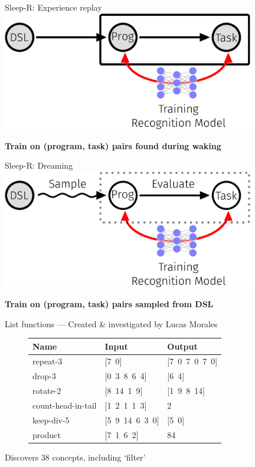 \documentclass{beamer}
\begin{document}
\begin{frame}[t]{Sleep-R: Experience replay}
  \includegraphics[width = 11cm]{figures/animation/Sleep-R-1.eps}

    \textbf{Train on (program, task) pairs found during waking}
\end{frame}
\begin{frame}[t]{Sleep-R: Dreaming}
  \includegraphics[width = 11cm]{figures/animation/Sleep-R-2.eps}

    \textbf{Train on (program, task) pairs sampled from DSL}

\end{frame}




\begin{frame}{List functions --- \small{Created \& investigated by Lucas
  Morales}}


  \vspace{1cm}
  
  \begin{figure}[b]\centering
\vspace{-0.5cm}  \begin{tabular}{lll}
    \toprule
    Name & Input & Output \\\midrule
    repeat-3 & [7\, 0] & [7\, 0\, 7\, 0\, 7\, 0] \\
    drop-3 & [0\, 3\, 8\, 6\, 4] & [6\, 4] \\
    rotate-2 & [8\, 14\, 1\, 9] & [1\, 9\, 8\, 14] \\
    count-head-in-tail & [1\, 2\, 1\, 1\, 3] & 2 \\
    keep-div-5 & [5\, 9\, 14\, 6\, 3\, 0] & [5\, 0] \\
    product & [7\, 1\, 6\, 2] & 84 \\
    \bottomrule
  \end{tabular}
\end{figure}

  Discovers 38 concepts, including `filter'
\end{frame}
\end{document}
